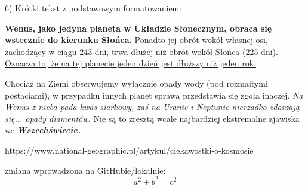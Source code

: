 6) Krótki tekst z podstawowym formatowaniem:

\textbf{Wenus, jako jedyna planeta w Układzie Słonecznym, obraca się wstecznie do kierunku Słońca.} Ponadto jej obrót wokół własnej osi, zachodzący w ciągu 243 dni, trwa dłużej niż obrót wokół Słońca (225 dni). \underline{Oznacza to, że na tej planecie jeden dzień jest dłuższy niż jeden rok.}

Chociaż na Ziemi obserwujemy wyłącznie opady wody (pod rozmaitymi postaciami), w przypadku innych planet sprawa przedstawia się zgoła inaczej. \textit{Na Wenus z nieba pada kwas siarkowy, zaś na Uranie i Neptunie nierzadko zdarzają się... opady diamentów.} Nie są to zresztą wcale najbardziej ekstremalne zjawiska we \textbf{\textit{\underline{Wszechświecie.}}}
 
\begingroup
\raggedleft
https://www.national-geographic.pl/artykul/ciekawostki-o-kosmosie
\endgroup



zmiana wprowadzona na GitHubie/lokalnie: \[a^{2}+b^{2}=c^{2}\]
